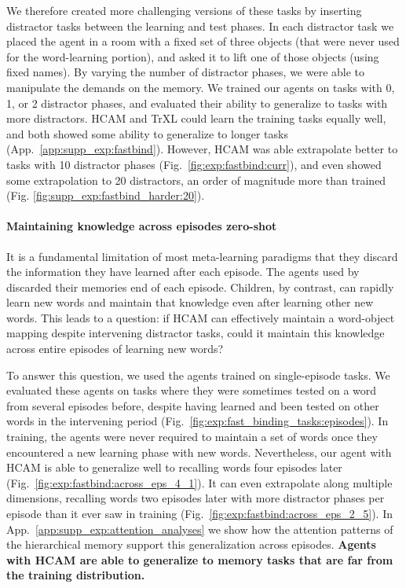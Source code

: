 \documentclass{article}
\begin{document}
We therefore created more challenging versions of these tasks by inserting distractor tasks between the learning and test phases. In each distractor task we placed the agent in a room with a fixed set of three objects (that were never used for the word-learning portion), and asked it to lift one of those objects (using fixed names). By varying the number of distractor phases, we were able to manipulate the demands on the memory. We trained our agents on tasks with 0, 1, or 2 distractor phases, and evaluated their ability to generalize to tasks with more distractors. HCAM and TrXL could learn the training tasks equally well, and both showed some ability to generalize to longer tasks (App.\ \ref{app:supp_exp:fastbind}). However, HCAM was able extrapolate better to tasks with 10 distractor phases (Fig.\ \ref{fig:exp:fastbind:curr}), and even showed some extrapolation to 20 distractors, an order of magnitude more than trained (Fig. \ref{fig:supp_exp:fastbind_harder:20}). 

\paragraph{Maintaining knowledge across episodes zero-shot}
It is a fundamental limitation of most meta-learning paradigms that they discard the information they have learned after each episode. The agents used by \citet{hill2020grounded} discarded their memories end of each episode. Children, by contrast, can rapidly learn new words and maintain that knowledge even after learning other new words. This leads to a question: if HCAM can effectively maintain a word-object mapping despite intervening distractor tasks, could it maintain this knowledge across entire episodes of learning new words?

To answer this question, we used the agents trained on single-episode tasks. We evaluated these agents on tasks where they were sometimes tested on a word from several episodes before, despite having learned and been tested on other words in the intervening period (Fig.\ \ref{fig:exp:fast_binding_tasks:episodes}). In training, the agents were never required to maintain a set of words once they encountered a new learning phase with new words. Nevertheless, our agent with HCAM is able to generalize well to recalling words four episodes later (Fig.\ \ref{fig:exp:fastbind:across_eps_4_1}). It can even extrapolate along multiple dimensions, recalling words two episodes later with more distractor phases per episode than it ever saw in training (Fig.\ \ref{fig:exp:fastbind:across_eps_2_5}). In App.\ \ref{app:supp_exp:attention_analyses} we show how the attention patterns of the hierarchical memory support this generalization across episodes. \textbf{Agents with HCAM are able to generalize to memory tasks that are far from the training distribution.}
\end{document}
